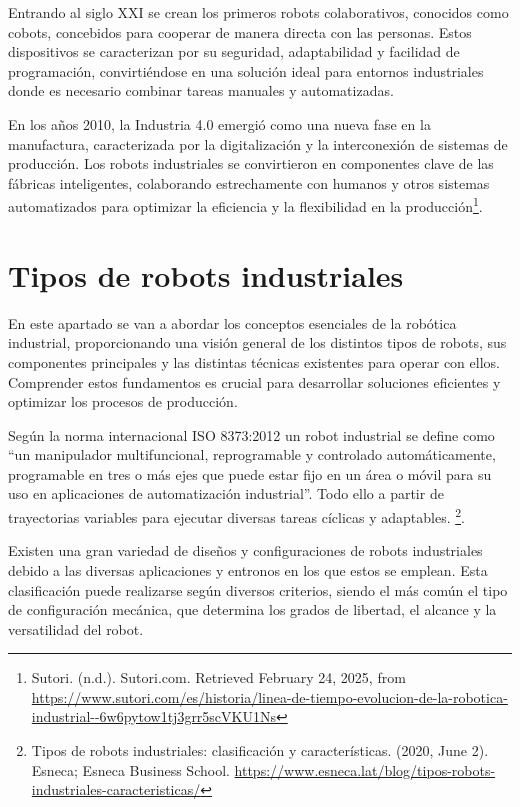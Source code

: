 Entrando al siglo XXI se crean los primeros robots colaborativos, conocidos como cobots, concebidos para cooperar de manera directa con las personas. Estos dispositivos se caracterizan por su seguridad, adaptabilidad y facilidad de programación, convirtiéndose en una solución ideal para entornos industriales donde es necesario combinar tareas manuales y automatizadas. 

En los años 2010, la Industria 4.0 emergió como una nueva fase en la manufactura, caracterizada por la digitalización y la interconexión de sistemas de producción.  Los robots industriales se convirtieron en componentes clave de las fábricas inteligentes, colaborando estrechamente con humanos y otros sistemas automatizados para optimizar la eficiencia y la flexibilidad en la producción\footnote{Sutori. (n.d.). Sutori.com. Retrieved February 24, 2025, from \url{ https://www.sutori.com/es/historia/linea-de-tiempo-evolucion-de-la-robotica-industrial--6w6pytow1tj3grr5scVKU1Ns}}. 

\section{Tipos de robots industriales}
\label{sec:cuartaseccion}

En este apartado se van a abordar los conceptos esenciales de la robótica industrial, proporcionando una visión general de los distintos tipos de robots, sus componentes principales y las distintas técnicas existentes para operar con ellos. Comprender estos fundamentos es crucial para desarrollar soluciones eficientes y optimizar los procesos de producción.

 Según la norma internacional ISO 8373:2012 un robot industrial se define como ``un manipulador multifuncional, reprogramable y controlado automáticamente, programable en tres o más ejes que puede estar fijo en un área o móvil para su uso en aplicaciones de automatización industrial''. Todo ello a partir de trayectorias variables para ejecutar diversas tareas cíclicas y adaptables. \footnote{Tipos de robots industriales: clasificación y características. (2020, June 2). Esneca; Esneca Business School. 
 \url{ https://www.esneca.lat/blog/tipos-robots-industriales-caracteristicas/}}. 
 
Existen una gran variedad de diseños y configuraciones de robots industriales debido a las diversas aplicaciones y entronos en los que estos se emplean. Esta clasificación puede realizarse según diversos criterios, siendo el más común el tipo de configuración mecánica, que determina los grados de libertad, el alcance y la versatilidad del robot.

